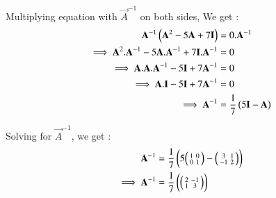 \documentclass[journal,12pt,twocolumn]{IEEEtran}
\begin{document}
Multiplying equation  with $\Vec{A}^{-1}$ on both sides, We get :
\begin{align}
\Vec{A}^{-1}\brak{\vec{A}^2 - 5\vec{A} + 7\vec{I}} &= 0.\Vec{A}^{-1} \\
\implies \vec{A}^2.\Vec{A}^{-1} - 5\vec{A}.\Vec{A}^{-1} + 7\vec{I}.\Vec{A}^{-1} &= 0 \\
\implies \vec{A}.\vec{A}.\Vec{A}^{-1} - 5\vec{I} + 7\Vec{A}^{-1} &= 0 \\
\implies \vec{A}.\vec{I} - 5\vec{I} + 7\Vec{A}^{-1} &= 0\\
\implies \Vec{A}^{-1} &= \frac{1}{7}\brak{5\vec{I} - \vec{A}}
\end{align}

Solving for $\Vec{A}^{-1}$, we get :
\begin{align}
    \Vec{A}^{-1} &= \frac{1}{7}\brak{5\myvec{ 1 & 0\\ 0 & 1} - \myvec{ 3 & 1\\ -1 & 2}} \\
    \implies \Vec{A}^{-1} &= \frac{1}{7}\brak{\myvec{ 2 & -1\\ 1 & 3}}
\end{align}
\end{document}
